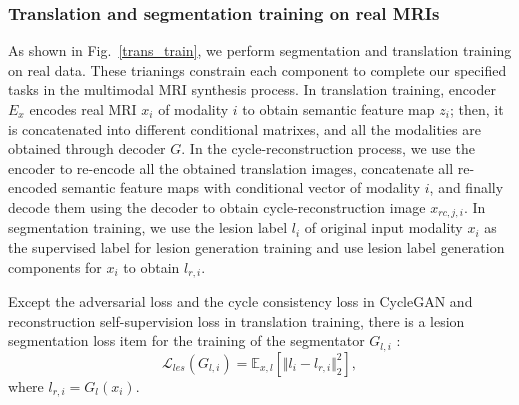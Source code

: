 \documentclass{ecai}
\begin{document}
\subsubsection{Translation and segmentation training on real MRIs}
As shown in Fig.~\ref{trans_train}, we perform segmentation and translation training on real data. These trianings constrain each component to complete our specified tasks in the multimodal MRI synthesis process.
In translation training, encoder $E_x$ encodes real MRI $x_i$ of modality $i$ to obtain semantic feature map $z_{i}$; then, it is concatenated into different conditional matrixes, and all the modalities are obtained through decoder $G$. In the cycle-reconstruction process, we use the encoder to re-encode all the obtained translation images, concatenate all re-encoded semantic feature maps with conditional vector of modality $i$, and finally decode them using the decoder to obtain cycle-reconstruction image $x_{rc,j,i}$. In segmentation training, we use the lesion label $l_i$ of original input modality $x_i$ as the supervised label for lesion generation training and use lesion label generation components for $x_i$ to obtain $l_{r,i}$. 

Except the adversarial loss and the cycle consistency loss in CycleGAN\cite{6zhu2017unpaired} and reconstruction self-supervision loss in translation training, there is a lesion segmentation loss item for the training of the segmentator $G_{l,i}$ :
\begin{equation}
\label{lesion segmentation loss}
\mathcal{L}_{les}(G_{l,i})=\mathbb{E}_{x,l}[\Vert{l_i-l_{r,i}}\Vert_{2}^{2}],
\end{equation}
where $l_{r,i}=G_l(x_{i})$.
\end{document}
